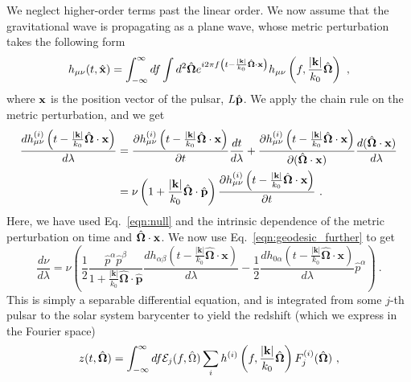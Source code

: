 \documentclass[prd,aps,psfig,nofootinbib,nobibnotes,superscriptaddress,preprintnumbers,times]{revtex4-2}\setlength{\topmargin}{-14mm}
\begin{document}
We neglect higher-order terms past the linear order. We now assume that the gravitational wave is propagating as a plane wave, whose metric perturbation takes the following form 
\begin{equation}\label{eqn:plane_wave}
    h_{\mu \nu}(t, \hat{\bf x}) = \int_{-\infty}^\infty df \int d^2 \hat{\bf \Omega} e^{i2\pi f \left(t - \frac{|{\bf k}|}{k_0} \hat{\bf \Omega}\cdot {\bf x}\right)}h_{\mu \nu}\left(f, \frac{|{\bf k}|}{k_0} \hat{\bf \Omega} \right) \ ,
\end{equation}
where ${\bf x}$ is the position vector of the pulsar, $L\hat{\bf p}$. We apply the chain rule on the metric perturbation, and we get
\begin{equation}\label{eqn:dhdlambda}
    \begin{aligned}
        \frac{dh^{(i)}_{\mu \nu} \left(t - \frac{|{\bf k}|}{k_0} \hat{\bf \Omega}\cdot {\bf x}\right) }{d\lambda } &= \frac{\partial h^{(i)}_{\mu \nu}\left(t - \frac{|{\bf k}|}{k_0} \hat{\bf \Omega}\cdot {\bf x}\right) }{\partial t} \frac{dt}{d \lambda} + \frac{\partial h^{(i)}_{\mu \nu}\left(t - \frac{|{\bf k}|}{k_0} \hat{\bf \Omega}\cdot {\bf x}\right) }{\partial (\hat{\bf \Omega}\cdot {\bf x})} \frac{d(\hat{\bf \Omega}\cdot {\bf x})}{d \lambda} \\ &= \nu\left( 1 + \frac{|{\bf k}|}{k_0} \hat{\bf \Omega}\cdot \hat{\bf p}\right) \frac{\partial h^{(i)}_{\mu \nu}\left(t - \frac{|{\bf k}|}{k_0} \hat{\bf \Omega}\cdot {\bf x}\right) }{\partial t} \ .
    \end{aligned}
\end{equation}
Here, we have used Eq.\ \ref{eqn:null} and the intrinsic dependence of the metric perturbation on time and $\hat{\bf \Omega}\cdot {\bf x}$. We now use Eq.\ \ref{eqn:geodesic_further} to get 
\begin{equation}\label{eqn:dnudl}
    \frac{d\nu}{d\lambda} = \nu \left( \frac{1}{2} \frac{\hat{p}^\alpha \hat{p}^\beta}{1+\frac{|\boldsymbol{k}|}{k_0} \hat{\boldsymbol{\Omega}} \cdot \hat{\boldsymbol{p}}}\frac{d h_{\alpha \beta}\left(t - \frac{|\boldsymbol{k}|}{k_0} \hat{\boldsymbol{\Omega}} \cdot {\boldsymbol{x}}\right)}{d \lambda} - \frac{1}{2} \frac{dh_{0\alpha}\left(t - \frac{|\boldsymbol{k}|}{k_0} \hat{\boldsymbol{\Omega}} \cdot {\boldsymbol{x}}\right)}{d\lambda}\hat{p}^\alpha \right) \ .
\end{equation}
This is simply a separable differential equation, and is integrated from some $j$-th pulsar to the solar system barycenter to yield the redshift (which we express in the Fourier space)
\begin{equation}\label{eqn:redshift}
    z(t, \hat{\bf \Omega}) = \int_{-\infty}^\infty df \mathcal{E}_j(f, \hat{\Omega}) \sum_i h^{(i)}\left(f, \frac{|{\bf k}|}{k_0} \hat{\bf \Omega}\right)F^{(i)}_j(\hat{\bf \Omega}) \ ,
\end{equation}
\end{document}
